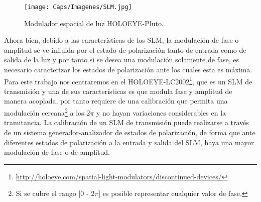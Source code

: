 \begin{figure}[!ht]
  \centering
    \texttt{[image: Caps/Imagenes/SLM.jpg]}
  \caption{Modulador espacial de luz HOLOEYE-Pluto.}
  \label{fig:slm}
\end{figure}


Ahora bien, debido a las características de los SLM, la modulación de fase o amplitud se ve influida por el estado de polarización tanto de entrada como de salida de la luz \cite{Iemmi2001, Moreno2003} y por tanto si se desea una modulación solamente de fase, es necesario caracterizar los estados de polarización ante los cuales esta es máxima. Para este trabajo nos centraremos en el HOLOEYE-LC2002\footnote{\url{http://holoeye.com/spatial-light-modulators/discontinued-devices/}}, que es un SLM de transmisión y una de sus características es que modula fase y amplitud de manera acoplada, por tanto requiere de una calibración que permita una modulación cercana\footnote{Si se cubre el rango [0 - $2\pi$] es posible representar cualquier valor de fase.} a los $2\pi$ y no hayan variaciones considerables en la tramitancia. La calibración de un SLM de transmisión puede realizarse a través de un sistema generador-analizador de estados de polarización, de forma que ante diferentes estados de polarización a la entrada y salida del SLM, haya una mayor modulación de fase o de amplitud.%

